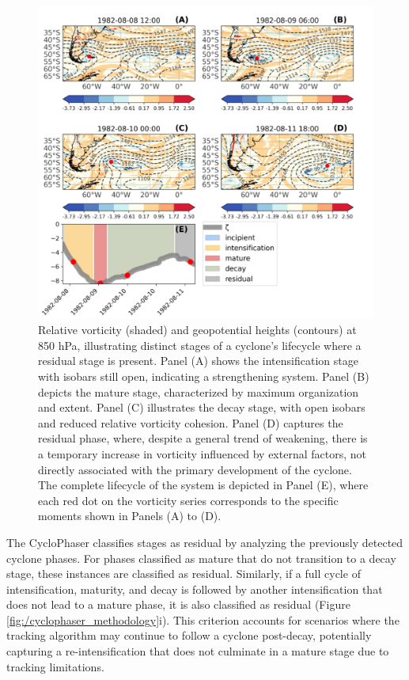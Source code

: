 \begin{figure}[h!]
\centering
\includegraphics[width=37pc]{figs_3/residual_study_case_edited.pdf}
\caption[Residual stage - study case]{Relative vorticity (shaded) and geopotential heights (contours) at 850 hPa, illustrating distinct stages of a cyclone's lifecycle where a residual stage is present. Panel (A) shows the intensification stage with isobars still open, indicating a strengthening system. Panel (B) depicts the mature stage, characterized by maximum organization and extent. Panel (C) illustrates the decay stage, with open isobars and reduced relative vorticity cohesion. Panel (D) captures the residual phase, where, despite a general trend of weakening, there is a temporary increase in vorticity influenced by external factors, not directly associated with the primary development of the cyclone. The complete lifecycle of the system is depicted in Panel (E), where each red dot on the vorticity series corresponds to the specific moments shown in Panels (A) to (D).}
\label{residual_study_case}
\end{figure}

The CycloPhaser classifies stages as residual by analyzing the previously detected cyclone phases. For phases classified as mature that do not transition to a decay stage, these instances are classified as residual. Similarly, if a full cycle of intensification, maturity, and decay is followed by another intensification that does not lead to a mature phase, it is also classified as residual (Figure \ref{fig:/cyclophaser_methodology}i). This criterion accounts for scenarios where the tracking algorithm may continue to follow a cyclone post-decay, potentially capturing a re-intensification that does not culminate in a mature stage due to tracking limitations.

